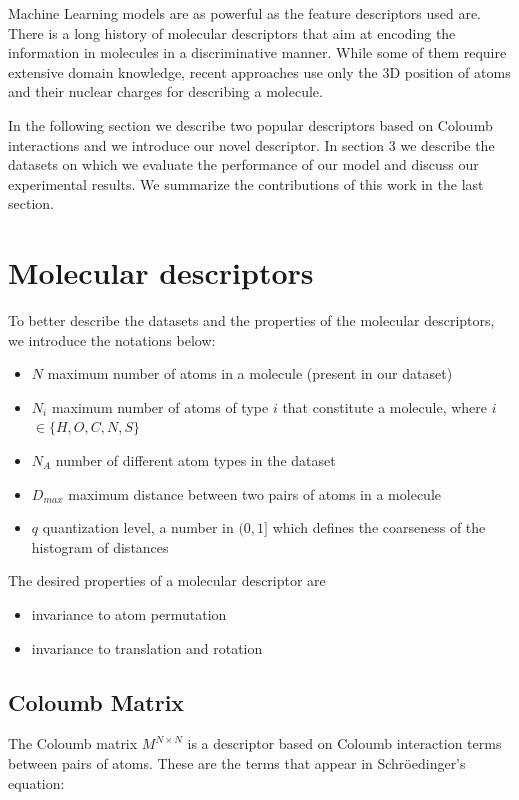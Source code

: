\documentclass{article}
\begin{document}
Machine Learning models are as powerful as the feature descriptors used are. There is a long history of molecular descriptors \cite{todeschini2000handbook} that aim at encoding the information in molecules in a discriminative manner. While some of them require extensive domain knowledge, recent approaches \cite{initialcoloumb} use only the 3D position of atoms and their nuclear charges for describing a molecule.

In the following section we describe two popular descriptors based on Coloumb interactions and we introduce our novel descriptor. In section 3 we describe the datasets on which we evaluate the performance of our model and discuss our experimental results. We summarize the contributions of this work in the last section.

\section{Molecular descriptors}

To better describe the datasets and the properties of the molecular descriptors, we introduce the notations below:
\begin{itemize}
\item $N$ maximum number of atoms in a molecule (present in our dataset)
\item $N_i$ maximum number of atoms of type $i$ that constitute a molecule, where $i$ $\in \{H, O, C, N, S\}$
\item $N_A$ number of different atom types in the dataset
\item $D_{max}$ maximum distance between two pairs of atoms in a molecule
\item $q$ quantization level, a number in $(0,1]$ which defines the coarseness of the histogram of distances
\end{itemize}
The desired properties of a molecular descriptor are
\begin{itemize}
 \item invariance to atom permutation
 \item invariance to translation and rotation
\end{itemize}

\subsection{Coloumb Matrix}
The Coloumb matrix\citep{initialcoloumb} $M^{N\times N}$ is a descriptor based on  Coloumb interaction terms between pairs of atoms. These are the terms that appear in Schröedinger's equation:
\end{document}

